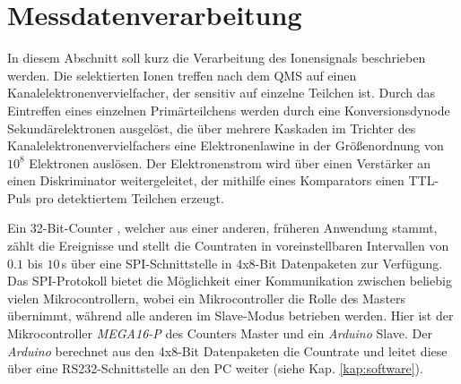 \section{Messdatenverarbeitung}\label{sec:messdatenverarbeitung}
In diesem Abschnitt soll kurz die Verarbeitung des Ionensignals beschrieben
werden. Die selektierten Ionen treffen nach dem QMS auf einen
Kanalelektronenvervielfacher, der sensitiv auf einzelne Teilchen ist. Durch das
Eintreffen eines einzelnen Primärteilchens werden durch eine Konversionsdynode
Sekundärelektronen ausgelöst, die über mehrere Kaskaden im Trichter des
Kanalelektronenvervielfachers eine Elektronenlawine in der Größenordnung von
$10^8$ Elektronen auslösen. Der Elektronenstrom wird über einen Verstärker an
einen Diskriminator weitergeleitet, der mithilfe eines Komparators einen
TTL-Puls pro detektiertem Teilchen erzeugt.\par
Ein 32-Bit-Counter \cite{counterkarte_countraten}, welcher aus einer
anderen, früheren Anwendung stammt, zählt die Ereignisse und stellt die
Countraten in voreinstellbaren Intervallen von $0.1$ bis $10\,$s über eine SPI-Schnittstelle in 4x8-Bit Datenpaketen zur Verfügung. Das SPI-Protokoll bietet die Möglichkeit einer Kommunikation
zwischen beliebig vielen Mikrocontrollern, wobei ein Mikrocontroller die Rolle
des Masters übernimmt, während alle anderen im Slave-Modus betrieben werden.
Hier ist der Mikrocontroller \textit{MEGA16-P} des Counters Master und ein
\textit{Arduino} Slave. Der \textit{Arduino} berechnet aus den 4x8-Bit Datenpaketen die Countrate
und leitet diese über eine RS232-Schnittstelle an den PC weiter (siehe Kap.
\ref{kap:software}).

